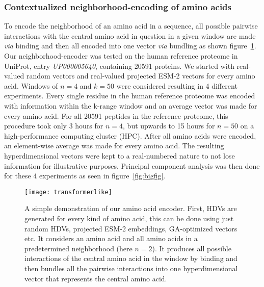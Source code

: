 \subsubsection*{Contextualized neighborhood-encoding of amino acids}\label{sssec:trans}
To encode the neighborhood of an amino acid in a sequence, all possible pairwise interactions with the central amino acid in question in a given window are made \textit{via} binding and then all encoded into one vector \textit{via} bundling as shown figure~\ref{fig:AAtr}. Our neighborhood-encoder was tested on the human reference proteome in UniProt, entry \textit{UP000005640}, containing 20591 proteins. We started with real-valued random vectors and real-valued projected ESM-2 vectors for every amino acid. Windows of $n = 4$ and $k = 50$ were considered resulting in 4 different experiments. Every single residue in the human reference proteome was encoded with information within the k-range window and an average vector was made for every amino acid. For all 20591 peptides in the reference proteome, this procedure took only 3 hours for $n = 4$, but upwards to 15 hours for $n = 50$ on a high-performance computing cluster (HPC). After all amino acids were encoded, an element-wise average was made for every amino acid. The resulting hyperdimensional vectors were kept to a real-numbered nature to not lose information for illustrative purposes. Principal component analysis was then done for these 4 experiments as seen in figure~\ref{fig:bigfig}. 

\begin{figure}[ht!]
    \centering
    \texttt{[image: transformerlike]}
    \caption{A simple demonstration of our amino acid encoder. First, HDVs are generated for every kind of amino acid, this can be done using just random HDVs, projected ESM-2 embeddings, GA-optimized vectors etc. It considers an amino acid and all amino acids in a predetermined neighborhood (here $n = 2$). It produces all possible interactions of the central amino acid in the window by binding and then bundles all the pairwise interactions into one hyperdimensional vector that represents the central amino acid.}\label{fig:AAtr}
\end{figure}

